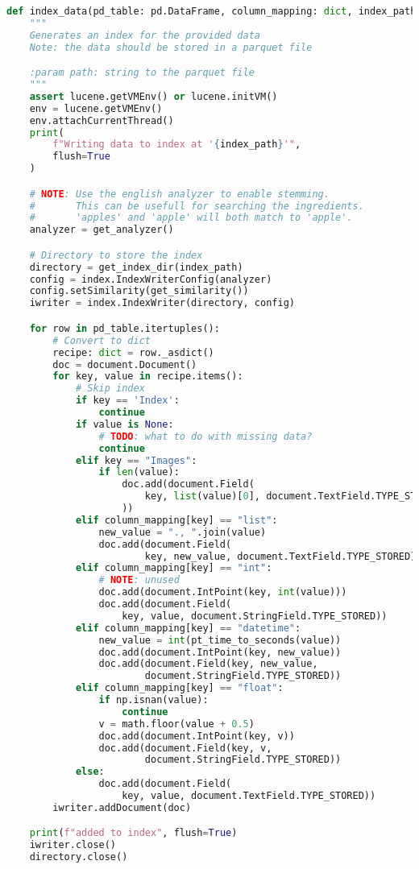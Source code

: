 \documentclass{article}
\begin{document}
\begin{lstlisting}[language=Python]
def index_data(pd_table: pd.DataFrame, column_mapping: dict, index_path: str):
    """
    Generates an index for the provided data
    Note: the data should be stored in a parquet file

    :param path: string to the parquet file
    """
    assert lucene.getVMEnv() or lucene.initVM()
    env = lucene.getVMEnv()
    env.attachCurrentThread()
    print(
        f"Writing data to index at '{index_path}'",
        flush=True
    )

    # NOTE: Use the english analyzer to enable stemming.
    #       This can be usefull for searching the ingredients.
    #       'apples' and 'apple' will both match to 'apple'.
    analyzer = get_analyzer()

    # Directory to store the index
    directory = get_index_dir(index_path)
    config = index.IndexWriterConfig(analyzer)
    config.setSimilarity(get_similarity())
    iwriter = index.IndexWriter(directory, config)

    for row in pd_table.itertuples():
        # Convert to dict
        recipe: dict = row._asdict()
        doc = document.Document()
        for key, value in recipe.items():
            # Skip index
            if key == 'Index':
                continue
            if value is None:
                # TODO: what to do with missing data?
                continue
            elif key == "Images":
                if len(value):
                    doc.add(document.Field(
                        key, list(value)[0], document.TextField.TYPE_STORED
                    ))
            elif column_mapping[key] == "list":
                new_value = "., ".join(value)
                doc.add(document.Field(
                        key, new_value, document.TextField.TYPE_STORED))
            elif column_mapping[key] == "int":
                # NOTE: unused
                doc.add(document.IntPoint(key, int(value)))
                doc.add(document.Field(
                    key, value, document.StringField.TYPE_STORED))
            elif column_mapping[key] == "datetime":
                new_value = int(pt_time_to_seconds(value))
                doc.add(document.IntPoint(key, new_value))
                doc.add(document.Field(key, new_value,
                        document.StringField.TYPE_STORED))
            elif column_mapping[key] == "float":
                if np.isnan(value):
                    continue
                v = math.floor(value + 0.5)
                doc.add(document.IntPoint(key, v))
                doc.add(document.Field(key, v,
                        document.StringField.TYPE_STORED))
            else:
                doc.add(document.Field(
                    key, value, document.TextField.TYPE_STORED))
        iwriter.addDocument(doc)

    print(f"added to index", flush=True)
    iwriter.close()
    directory.close()

\end{lstlisting}
\end{document}
